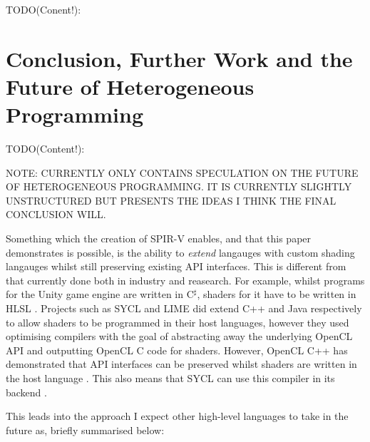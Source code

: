 \documentclass[a4paper,12pt,twoside,openright]{report}
\begin{document}
TODO(Conent!):





\chapter{Conclusion, Further Work and the Future of Heterogeneous Programming}



TODO(Content!):

NOTE: CURRENTLY ONLY CONTAINS SPECULATION ON THE FUTURE OF HETEROGENEOUS
PROGRAMMING. IT IS CURRENTLY SLIGHTLY UNSTRUCTURED BUT PRESENTS THE IDEAS
I THINK THE FINAL CONCLUSION WILL.

Something which the creation of SPIR-V enables, and that this paper
demonstrates is possible, is the ability to \textit{extend} langauges with
custom shading langauges whilst still preserving existing API interfaces. This
is different from that currently done both in industry and reasearch. For
example, whilst programs for the Unity game engine are written in C$^\sharp$,
shaders for it have to be written in HLSL \cite{TODO}. Projects such as SYCL
and LIME did extend C++ and Java respectively to allow shaders to be programmed
in their host languages, however they used optimising compilers with the goal
of abstracting away the underlying OpenCL API and outputting OpenCL C code for
shaders. However, OpenCL C++ has demonstrated that API interfaces can be
preserved whilst shaders are written in the host language
\cite{OpenCLCPPWhitePaper}. This also means that SYCL can use this compiler in
its backend \cite{TODO}.

This leads into the approach I expect other high-level languages to take in the
future as, briefly summarised below:
\end{document}
